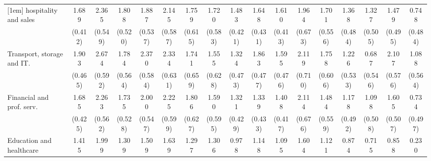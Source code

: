 {\begin{tabular}{l*{16}{c}}
[1em]
hospitality and sales&       1.689\sym{***}&       2.365\sym{***}&       1.808\sym{***}&       1.887\sym{***}&       2.145\sym{***}&       1.759\sym{**} &       1.720\sym{**} &       1.483\sym{***}&       1.648\sym{***}&       1.610\sym{***}&       1.964\sym{**} &       1.701\sym{**} &       1.368\sym{**} &       1.327\sym{**} &       1.479\sym{**} &       0.748         \\
                    &     (0.412)         &     (0.549)         &     (0.520)         &     (0.537)         &     (0.587)         &     (0.615)         &     (0.583)         &     (0.421)         &     (0.431)         &     (0.413)         &     (0.673)         &     (0.556)         &     (0.484)         &     (0.505)         &     (0.495)         &     (0.484)         \\
[1em]
Transport, storage and IT.&       1.903\sym{***}&       2.674\sym{***}&       1.784\sym{**} &       2.370\sym{***}&       2.334\sym{***}&       1.741\sym{**} &       1.555\sym{*}  &       1.324\sym{**} &       1.863\sym{***}&       1.595\sym{***}&       2.119\sym{**} &       1.758\sym{**} &       1.226\sym{*}  &       0.687         &       2.107\sym{***}&       1.088         \\
                    &     (0.465)         &     (0.592)         &     (0.564)         &     (0.584)         &     (0.631)         &     (0.659)         &     (0.628)         &     (0.473)         &     (0.477)         &     (0.476)         &     (0.710)         &     (0.606)         &     (0.533)         &     (0.546)         &     (0.576)         &     (0.564)         \\
[1em]
Financial and prof. serv.&       1.685\sym{***}&       2.263\sym{***}&       1.735\sym{**} &       2.000\sym{***}&       2.225\sym{***}&       1.806\sym{**} &       1.590\sym{**} &       1.321\sym{**} &       1.339\sym{**} &       1.408\sym{***}&       2.114\sym{**} &       1.484\sym{**} &       1.178\sym{*}  &       1.098\sym{*}  &       1.605\sym{**} &       0.734         \\
                    &     (0.425)         &     (0.562)         &     (0.528)         &     (0.547)         &     (0.599)         &     (0.627)         &     (0.595)         &     (0.429)         &     (0.433)         &     (0.417)         &     (0.676)         &     (0.559)         &     (0.492)         &     (0.508)         &     (0.507)         &     (0.497)         \\
[1em]
Education and healthcare&       1.415\sym{***}&       1.999\sym{***}&       1.309\sym{*}  &       1.509\sym{**} &       1.639\sym{**} &       1.297\sym{*}  &       1.306\sym{*}  &       0.978\sym{*}  &       1.148\sym{**} &       1.095\sym{**} &       1.604\sym{*}  &       1.121\sym{*}  &       0.874         &       0.715         &       0.858         &       0.230         \\

\end{tabular}}

